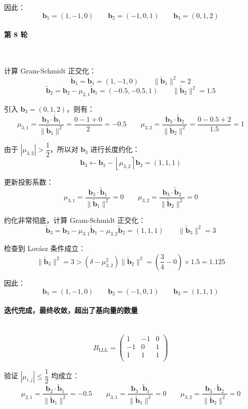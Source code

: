 \documentclass{article}
\begin{document}
因此：
\[ \bm{b}_1=(1,-1,0)\qquad\bm{b}_2=(-1,0,1)\qquad\bm{b}_3=(0,1,2) \]



\paragraph*{第 8 轮}~{}

计算 Gram-Schmidt 正交化：
\[ \tilde{\bm{b}}_1=\bm{b}_1=(1,-1,0)\qquad \|\tilde{\bm{b}}_1\|^2=2 \]
\[ \tilde{\bm{b}}_2=\bm{b}_2-\mu_{2,1}\tilde{\bm{b}}_1=(-0.5,-0.5,1)\qquad\|\tilde{\bm{b}}_2\|^2=1.5 \]

引入 $\bm{b}_3=(0,1,2)$，则有：
\[ \mu_{3,1}=\dfrac{\bm{b}_3\cdot\tilde{\bm{b}}_1}{\|\tilde{\bm{b}}_1\|^2}=\dfrac{0-1+0}{2}=-0.5\qquad\mu_{3,2}=\dfrac{\bm{b}_3\cdot\tilde{\bm{b}}_2}{\|\tilde{\bm{b}}_2\|^2}=\dfrac{0-0.5+2}{1.5}=1 \]

由于 $|\mu_{3,2}|>\dfrac{1}{2}$，所以对 $\bm{b}_3$ 进行长度约化：
\[ \bm{b}_3\leftarrow\bm{b}_3-\left\lfloor\mu_{3,2}\right\rceil\bm{b}_2=(1,1,1) \]

更新投影系数：
\[ \mu_{3,1}=\dfrac{\bm{b}_3\cdot\tilde{\bm{b}}_1}{\|\tilde{\bm{b}}_1\|^2}=0\qquad\mu_{3,2}=\dfrac{\bm{b}_3\cdot\tilde{\bm{b}}_2}{\|\tilde{\bm{b}}_2\|^2}=0 \]

约化非常彻底，计算 Gram-Schmidt 正交化：
\[ \tilde{\bm{b}}_3=\bm{b}_3-\mu_{3,1}\tilde{\bm{b}}_1-\mu_{3,2}\tilde{\bm{b}}_2=(1,1,1)\qquad\|\tilde{\bm{b}}_3\|^2=3 \]

检查到 Lov\'asz 条件成立：
\[ \|\tilde{\bm{b}}_{3}\|^2=3>(\delta-\mu_{3,2}^2)\|\tilde{\bm{b}}_{2}\|^2=\left(\dfrac{3}{4}-0\right)\times1.5=1.125 \]

因此：
\[ \bm{b}_1=(1,-1,0)\qquad\bm{b}_2=(-1,0,1)\qquad\bm{b}_3=(1,1,1) \]



\paragraph*{迭代完成，最终收敛，超出了基向量的数量}~{}
\[ B_{\text{LLL}}=\begin{pmatrix}
    1 & -1 & 0 \\
    -1 & 0 & 1 \\
    1 & 1 & 1 \\
\end{pmatrix} \]

验证 $|\mu_{i,j}|\leqslant\dfrac{1}{2}$ 均成立：
\[ \mu_{2,1}=\dfrac{\bm{b}_2\cdot\tilde{\bm{b}}_1}{\|\tilde{\bm{b}}_1\|^2}=-0.5\qquad\mu_{3,1}=\dfrac{\bm{b}_3\cdot\tilde{\bm{b}}_1}{\|\tilde{\bm{b}}_1\|^2}=0\qquad\mu_{3,2}=\dfrac{\bm{b}_3\cdot\tilde{\bm{b}}_2}{\|\tilde{\bm{b}}_2\|^2}=0 \]
\end{document}
